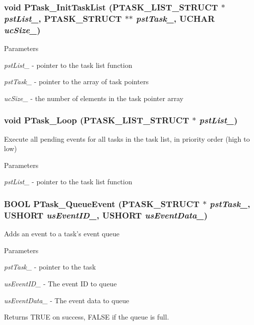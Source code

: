 \subsubsection[{PTask\_\-InitTaskList}]{\setlength{\rightskip}{0pt plus 5cm}void PTask\_\-InitTaskList ({\bf PTASK\_\-LIST\_\-STRUCT} $\ast$ {\em pstList\_\-}, \/  {\bf PTASK\_\-STRUCT} $\ast$$\ast$ {\em pstTask\_\-}, \/  UCHAR {\em ucSize\_\-})}\label{ptask_8c_a0db5465e03e892a4a468227fa80484e7}

\begin{DoxyParams}{Parameters}
\item[{\em pstList\_\-}]-\/ pointer to the task list function \item[{\em pstTask\_\-}]-\/ pointer to the array of task pointers \item[{\em ucSize\_\-}]-\/ the number of elements in the task pointer array \end{DoxyParams}
\subsubsection[{PTask\_\-Loop}]{\setlength{\rightskip}{0pt plus 5cm}void PTask\_\-Loop ({\bf PTASK\_\-LIST\_\-STRUCT} $\ast$ {\em pstList\_\-})}\label{ptask_8c_af3d5193f9a8ace23109ffd399b3a1a8f}
Execute all pending events for all tasks in the task list, in priority order (high to low)


\begin{DoxyParams}{Parameters}
\item[{\em pstList\_\-}]-\/ pointer to the task list function \end{DoxyParams}
\subsubsection[{PTask\_\-QueueEvent}]{\setlength{\rightskip}{0pt plus 5cm}BOOL PTask\_\-QueueEvent ({\bf PTASK\_\-STRUCT} $\ast$ {\em pstTask\_\-}, \/  USHORT {\em usEventID\_\-}, \/  USHORT {\em usEventData\_\-})}\label{ptask_8c_afc271184bbf5c40598ce8d7d7e1d8b7c}
Adds an event to a task's event queue


\begin{DoxyParams}{Parameters}
\item[{\em pstTask\_\-}]-\/ pointer to the task \item[{\em usEventID\_\-}]-\/ The event ID to queue \item[{\em usEventData\_\-}]-\/ The event data to queue \end{DoxyParams}
\begin{DoxyReturn}{Returns}
TRUE on success, FALSE if the queue is full. 
\end{DoxyReturn}
